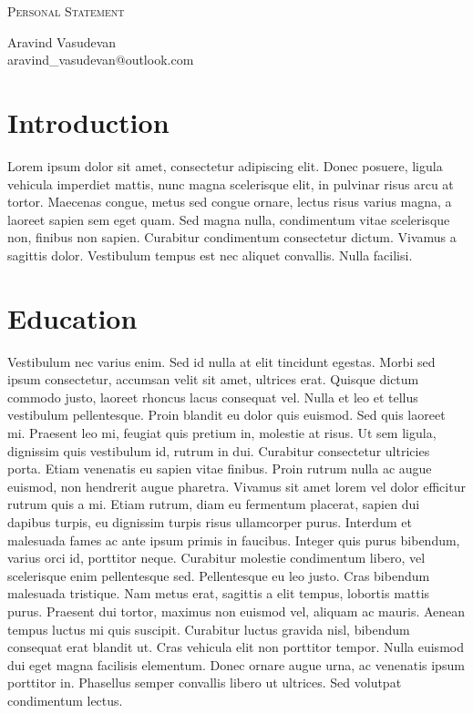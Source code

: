 \documentclass[12pt, letterpaper]{article}
\makeatletter
\renewcommand{\title}{Personal Statement}
\newcommand{\name}{Aravind Vasudevan}
\newcommand{\email}{aravind\_vasudevan@outlook.com}
\makeatother
\begin{document}
\begin{center}{\color{headingcolor} \huge \scshape \title}\end{center}
\begin{center}\vspace{0.2em} {\color{headingcolor} \Large \name\\}
  {\color{headingcolor} \email}\end{center}

\section*{Introduction}
Lorem ipsum dolor sit amet, consectetur adipiscing elit. Donec posuere, ligula vehicula imperdiet mattis, nunc magna scelerisque elit, in pulvinar risus arcu at tortor. Maecenas congue, metus sed congue ornare, lectus risus varius magna, a laoreet sapien sem eget quam. Sed magna nulla, condimentum vitae scelerisque non, finibus non sapien. Curabitur condimentum consectetur dictum. Vivamus a sagittis dolor. Vestibulum tempus est nec aliquet convallis. Nulla facilisi.

\section*{Education}
Vestibulum nec varius enim. Sed id nulla at elit tincidunt egestas. Morbi sed ipsum consectetur, accumsan velit sit amet, ultrices erat. Quisque dictum commodo justo, laoreet rhoncus lacus consequat vel. Nulla et leo et tellus vestibulum pellentesque. Proin blandit eu dolor quis euismod. Sed quis laoreet mi. Praesent leo mi, feugiat quis pretium in, molestie at risus. Ut sem ligula, dignissim quis vestibulum id, rutrum in dui. Curabitur consectetur ultricies porta. Etiam venenatis eu sapien vitae finibus. Proin rutrum nulla ac augue euismod, non hendrerit augue pharetra. Vivamus sit amet lorem vel dolor efficitur rutrum quis a mi. Etiam rutrum, diam eu fermentum placerat, sapien dui dapibus turpis, eu dignissim turpis risus ullamcorper purus. Interdum et malesuada fames ac ante ipsum primis in faucibus. Integer quis purus bibendum, varius orci id, porttitor neque. Curabitur molestie condimentum libero, vel scelerisque enim pellentesque sed. Pellentesque eu leo justo. Cras bibendum malesuada tristique. Nam metus erat, sagittis a elit tempus, lobortis mattis purus. Praesent dui tortor, maximus non euismod vel, aliquam ac mauris. Aenean tempus luctus mi quis suscipit. Curabitur luctus gravida nisl, bibendum consequat erat blandit ut. Cras vehicula elit non porttitor tempor. Nulla euismod dui eget magna facilisis elementum. Donec ornare augue urna, ac venenatis ipsum porttitor in. Phasellus semper convallis libero ut ultrices. Sed volutpat condimentum lectus.
\end{document}
